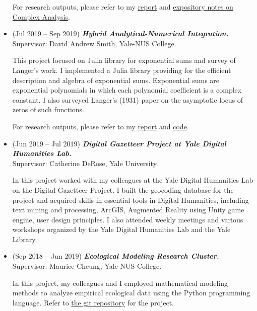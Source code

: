 \documentclass[11pt,reqno,oneside,a4paper]{article}
\begin{document}
\begin{itemize}
		For research outputs, please refer to my \href{https://github.com/zhangliu6/pdfs/blob/master/rank-terms-liu.pdf}{report} and  \href{https://github.com/zhangliu6/pdfs/blob/master/notes-on-complex-analysis-liu.pdf}{expository notes on Complex Analysis}.
		
		\item (Jul 2019 -- Sep 2019) \emph{\textbf{Hybrid Analytical-Numerical Integration.}}\\
		Supervisor: David Andrew Smith, Yale-NUS College.
		
		\par This project focused on Julia library for exponential sums and survey of Langer's work. I implemented a Julia library providing for the efficient description and algebra of exponential sums. Exponential sums are exponential polynomials in which each polynomial coefficient is a complex constant. I also surveyed Langer's (1931) paper on the asymptotic locus of zeros of such functions.
	 	
	 	For research outputs, please refer to my \href{https://www.unifiedtransformlab.com/outputs.html#Zha2019a}{report} and \href{https://www.unifiedtransformlab.com/outputs.html#Zha2019b}{code}.
	 	
		\item (Jun 2019 -- Jul 2019) \emph{\textbf{Digital Gazetteer Project at Yale Digital Humanities Lab.}}\\
		\hspace{0.2in}Supervisor: Catherine DeRose, Yale University.
		
		\par In this project worked with my colleagues at the Yale Digital Humanities Lab on the Digital Gazetteer Project. I built the geocoding database for the project and acquired skills in essential tools in Digital Humanities, including text mining and processing, ArcGIS, Augmented Reality using Unity game engine, user design principles. I also attended weekly meetings and various workshops organized by the Yale Digital Humanities Lab and the Yale Library. 
		
		\item (Sep 2018 -- Jun 2019)  \emph{\textbf{Ecological Modeling Research Cluster.}}\\
		\hspace{0.2in}Supervisor: Maurice Cheung, Yale-NUS College.
		 
		\par In this project, my colleagues and I employed mathematical modeling methods to analyze empirical ecological data using the Python programming language. Refer to \href{https://github.com/mauriceccy/ecologicalmodelling}{the git repository} for the project.
		

\end{itemize}
\end{document}
